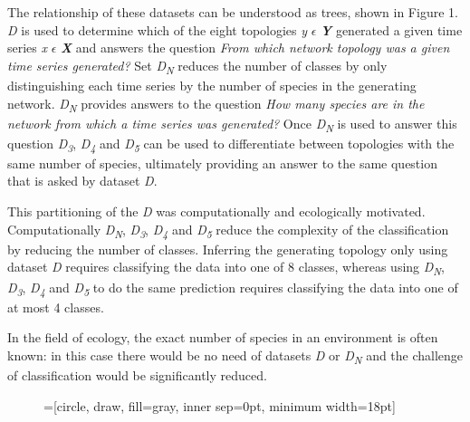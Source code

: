 \documentclass[letterpaper, 10 pt, conference]{ieeeconf}  %
\begin{document}
The relationship of these datasets can be understood as trees, shown in Figure 1. \textit{D} is used to determine which of the eight topologies \textit{y} $\epsilon$ \textit{\textbf{Y}} generated a given time series \textit{x} $\epsilon$ \textit{\textbf{X}} and answers the question \textit{From which network topology was a given time series generated?} Set \textit{D\textsubscript{N}} reduces the number of classes by only distinguishing each time series by the number of species in the generating network. \textit{D\textsubscript{N}} provides answers to the question \textit{How many species are in the network from which a time series was generated?} Once \textit{D\textsubscript{N}} is used to answer this question \textit{D\textsubscript{3}}, \textit{D\textsubscript{4}} and \textit{D\textsubscript{5}} can be used to differentiate between topologies with the same number of species, ultimately providing an answer to the same question that is asked by dataset \textit{D}.

This partitioning of the \textit{D} was computationally and ecologically motivated. Computationally \textit{D\textsubscript{N}}, \textit{D\textsubscript{3}}, \textit{D\textsubscript{4}} and \textit{D\textsubscript{5}} reduce the complexity of the classification by reducing the number of classes. Inferring the generating topology only using dataset \textit{D} requires classifying the data into one of 8 classes, whereas using \textit{D\textsubscript{N}}, \textit{D\textsubscript{3}}, \textit{D\textsubscript{4}} and \textit{D\textsubscript{5}} to do the same prediction requires classifying the data into one of at most 4 classes.

In the field of ecology, the exact number of species in an environment is often known: in this case there would be no need of datasets \textit{D} or \textit{D\textsubscript{N}} and the challenge of classification would be significantly reduced. 

\begin{figure}
	\centering
	=[circle, draw, fill=gray,
                        inner sep=0pt, minimum width=18pt]
\end{figure}    
    
\end{document}
